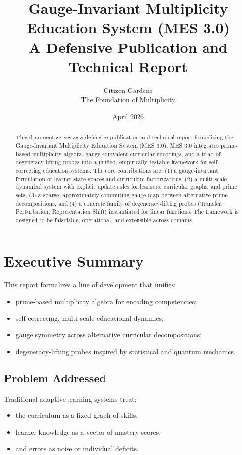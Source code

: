 \documentclass[11pt]{article}
\title{Gauge-Invariant Multiplicity Education System (MES 3.0)\\
A Defensive Publication and Technical Report}
\author{Citizen Gardens \\ The Foundation of Multiplicity}
\date{April 2026}
\begin{document}
\maketitle

\begin{abstract}
This document serves as a defensive publication and technical report formalizing the Gauge-Invariant Multiplicity Education System (MES 3.0). MES 3.0 integrates prime-based multiplicity algebra, gauge-equivalent curricular encodings, and a triad of degeneracy-lifting probes into a unified, empirically testable framework for self-correcting education systems. The core contributions are: (1) a gauge-invariant formulation of learner state spaces and curriculum factorizations, (2) a multi-scale dynamical system with explicit update rules for learners, curricular graphs, and prime sets, (3) a sparse, approximately commuting gauge map between alternative prime decompositions, and (4) a concrete family of degeneracy-lifting probes (Transfer, Perturbation, Representation Shift) instantiated for linear functions. The framework is designed to be falsifiable, operational, and extensible across domains.
\end{abstract}

\tableofcontents

\section{Executive Summary}

This report formalizes a line of development that unifies:
\begin{itemize}[itemsep=3pt]
  \item prime-based multiplicity algebra for encoding competencies;
  \item self-correcting, multi-scale educational dynamics;
  \item gauge symmetry across alternative curricular decompositions;
  \item degeneracy-lifting probes inspired by statistical and quantum mechanics.
\end{itemize}

\subsection{Problem Addressed}

Traditional adaptive learning systems treat:
\begin{itemize}[itemsep=3pt]
  \item the curriculum as a fixed graph of skills,
  \item learner knowledge as a vector of mastery scores,
  \item and errors as noise or individual deficits.
\end{itemize}
\end{document}
